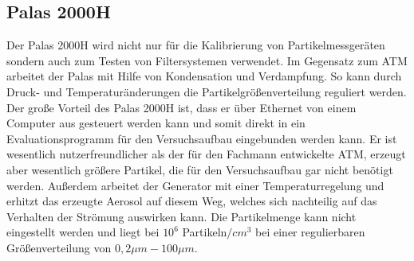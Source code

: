 \subsection{Palas 2000H}
Der Palas 2000H wird nicht nur f\"{u}r die Kalibrierung von Partikelmessger\"{a}ten sondern auch zum Testen von Filtersystemen verwendet. Im Gegensatz zum ATM arbeitet der Palas mit Hilfe von Kondensation und Verdampfung. So kann durch Druck- und Temperatur\"{a}nderungen die Partikelgr\"{o}{\ss}enverteilung reguliert werden. Der gro{\ss}e Vorteil des Palas 2000H ist, dass er \"{u}ber Ethernet von einem Computer aus gesteuert werden kann und somit direkt in ein Evaluationsprogramm f\"{u}r den Versuchsaufbau eingebunden werden kann. Er ist wesentlich nutzerfreundlicher als der f\"{u}r den Fachmann entwickelte ATM, erzeugt aber wesentlich gr\"{o}{\ss}ere Partikel, die f\"{u}r den Versuchsaufbau gar nicht ben\"{o}tigt werden. Au{\ss}erdem arbeitet der Generator mit einer Temperaturregelung und erhitzt das erzeugte Aerosol auf diesem Weg, welches sich nachteilig auf das Verhalten der Str\"{o}mung auswirken kann. Die Partikelmenge kann nicht eingestellt werden und liegt bei \(10^6\) Partikeln\(/cm^3\) bei einer regulierbaren Gr\"{o}{\ss}enverteilung von \(0,2 \mu m - 100\mu m\).\cite{palas}